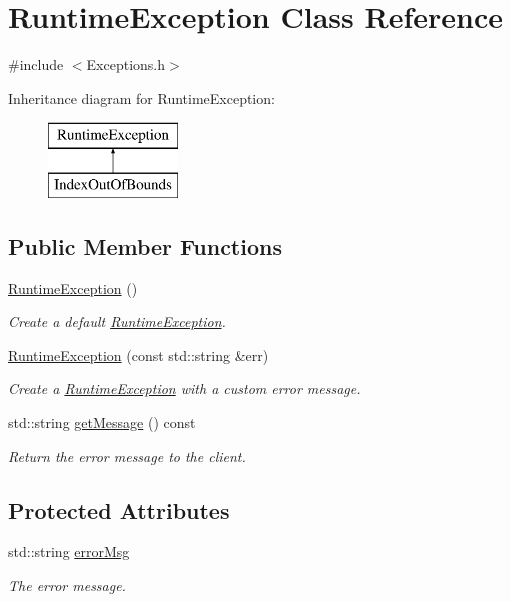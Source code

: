 \hypertarget{class_runtime_exception}{}\section{Runtime\+Exception Class Reference}
\label{class_runtime_exception}


{\ttfamily \#include $<$Exceptions.\+h$>$}

Inheritance diagram for Runtime\+Exception\+:\begin{figure}[H]
\begin{center}
\leavevmode
\includegraphics[height=2.000000cm]{class_runtime_exception}
\end{center}
\end{figure}
\subsection*{Public Member Functions}
\begin{DoxyCompactItemize}
\item 
\hyperlink{class_runtime_exception_ae86e31b0c6d823e7097be268d502140e}{Runtime\+Exception} ()
\begin{DoxyCompactList}\small\item\em Create a default \hyperlink{class_runtime_exception}{Runtime\+Exception}. \end{DoxyCompactList}\item 
\hyperlink{class_runtime_exception_aa088818f62804acab75a1a1c6b6c504c}{Runtime\+Exception} (const std\+::string \&err)
\begin{DoxyCompactList}\small\item\em Create a \hyperlink{class_runtime_exception}{Runtime\+Exception} with a custom error message. \end{DoxyCompactList}\item 
std\+::string \hyperlink{class_runtime_exception_abc78ad4db28b4a879725f4c6b7622405}{get\+Message} () const 
\begin{DoxyCompactList}\small\item\em Return the error message to the client. \end{DoxyCompactList}\end{DoxyCompactItemize}
\subsection*{Protected Attributes}
\begin{DoxyCompactItemize}
\item 
std\+::string \hyperlink{class_runtime_exception_a02a4bcba40c9cf48be9565556940eef9}{error\+Msg}
\begin{DoxyCompactList}\small\item\em The error message. \end{DoxyCompactList}\end{DoxyCompactItemize}


